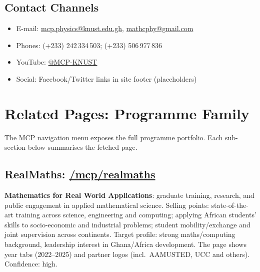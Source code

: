 \documentclass[11pt,a4paper]{article}
\begin{document}
\subsection*{Contact Channels}
\begin{itemize}[leftmargin=1.4em]
  \item E-mail: \href{mailto:mcp.physics@knust.edu.gh}{mcp.physics@knust.edu.gh}, \href{mailto:mathcphy@gmail.com}{mathcphy@gmail.com}
  \item Phones: (+233) 242\,334\,503; (+233) 506\,977\,836
  \item YouTube: \href{https://www.youtube.com/@MCP-KNUST}{@MCP-KNUST}
  \item Social: Facebook/Twitter links in site footer (placeholders)
\end{itemize}

\section{Related Pages: Programme Family}

The MCP navigation menu exposes the full programme portfolio. Each sub-section below summarises the fetched page.

\subsection{RealMaths: \href{https://physics.knust.edu.gh/mcp/realmaths}{/mcp/realmaths}}
\textbf{Mathematics for Real World Applications}: graduate training, research, and public engagement in applied mathematical science. Selling points: state-of-the-art training across science, engineering and computing; applying African students' skills to socio-economic and industrial problems; student mobility/exchange and joint supervision across continents. Target profile: strong maths/computing background, leadership interest in Ghana/Africa development. The page shows year tabs (2022--2025) and partner logos (incl.\ AAMUSTED, UCC and others). Confidence: high.
\end{document}
